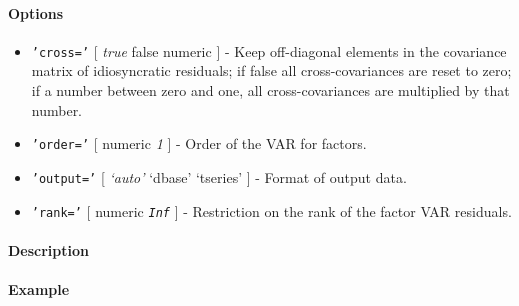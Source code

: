  \paragraph{Options}
 
 \begin{itemize}
 \item
   \texttt{'cross='} {[} \emph{true} \textbar{} false \textbar{} numeric
   {]} - Keep off-diagonal elements in the covariance matrix of
   idiosyncratic residuals; if false all cross-covariances are reset to
   zero; if a number between zero and one, all cross-covariances are
   multiplied by that number.
 \item
   \texttt{'order='} {[} numeric \textbar{} \emph{1} {]} - Order of the
   VAR for factors.
 \item
   \texttt{'output='} {[} \emph{`auto'} \textbar{} `dbase' \textbar{}
   `tseries' {]} - Format of output data.
 \item
   \texttt{'rank='} {[} numeric \textbar{} \emph{\texttt{Inf}} {]} -
   Restriction on the rank of the factor VAR residuals.
 \end{itemize}
 
 \paragraph{Description}
 
 \paragraph{Example}


